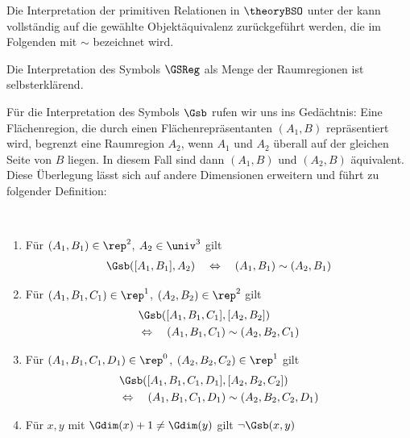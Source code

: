         Die Interpretation der primitiven Relationen in $\theoryBSO$ unter der \strukt kann vollständig auf die gewählte Objektäquivalenz zurückgeführt werden, die im Folgenden mit $\sim$ bezeichnet wird.

        Die
        \marginpar{$\GSReg$}
        Interpretation des Symbols $\GSReg$ als Menge der Raumregionen ist selbsterklärend.
        
        Für
        \marginpar{$\Gsb$}
        die Interpretation des Symbols $\Gsb$ rufen wir uns ins Gedächtnis:
        Eine Flächenregion, die durch einen Flächenrepräsentanten $(A_1,B)$ repräsentiert wird, begrenzt eine Raumregion $A_2$, wenn $A_1$ und $A_2$ überall auf der gleichen Seite von $B$ liegen. In diesem Fall sind dann $(A_1,B)$ und $(A_2, B)$ äquivalent.
        Diese Überlegung lässt sich auf andere Dimensionen erweitern und führt zu folgender Definition:
%
        \begin{dfn}\ \vspace{0pt}

            \begin{enumerate}
                \item Für $(A_1,B_1) \in \rep^2$, $A_2 \in \univ^3$ gilt 
                    \begin{align*}
                        \Gsb([A_1,B_1],A_2) \quad \Leftrightarrow \quad (A_1,B_1) \sim (A_2,B_1)
                    \end{align*}
                \item Für $(A_1,B_1,C_1) \in \rep^1$, $(A_2,B_2) \in \rep^2$ gilt 
                    \begin{align*}
                        &\Gsb([A_1,B_1,C_1],[A_2,B_2]) \quad \\
                        &\Leftrightarrow  \quad (A_1,B_1,C_1) \sim (A_2,B_2,C_1)
                    \end{align*}
                \item Für $(A_1,B_1,C_1,D_1) \in \rep^0$, $(A_2,B_2,C_2) \in \rep^1$ gilt 
                    \begin{align*}
                        &\Gsb([A_1,B_1,C_1,D_1],[A_2,B_2,C_2]) \quad \\
                        &\Leftrightarrow  \quad (A_1,B_1,C_1,D_1) \sim (A_2,B_2,C_2,D_1)
                    \end{align*}
                \item Für $x, y$ mit $\Gdim(x) + 1 \neq \Gdim(y)$ gilt $\neg \Gsb(x,y)$
            \end{enumerate}
            
        \end{dfn}
